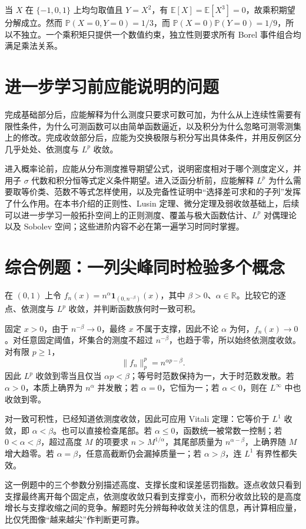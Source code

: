 \documentclass[UTF8,12pt,a4paper,fontset=fandol]{ctexbook}
\begin{document}
当 $X$ 在 $\{-1,0,1\}$ 上均匀取值且 $Y=X^2$，有 $\mathbb E[X]=\mathbb E[X^3]=0$，故乘积期望分解成立。然而
$\mathbb P(X=0,Y=0)=1/3$，而 $\mathbb P(X=0)\mathbb P(Y=0)=1/9$，所以不独立。一个乘积矩只提供一个数值约束，独立性则要求所有 Borel 事件组合均满足乘法关系。

\section{进一步学习前应能说明的问题}
完成基础部分后，应能解释为什么测度只要求可数可加，为什么从上连续性需要有限性条件，为什么可测函数可以由简单函数逼近，以及积分为什么忽略可测零测集上的修改。完成收敛部分后，应能为交换极限与积分写出具体条件，并用反例区分几乎处处、依测度与 $L^p$ 收敛。

进入概率论前，应能从分布测度推导期望公式，说明密度相对于哪个测度定义，并用子 $\sigma$ 代数和积分恒等式定义条件期望。进入泛函分析前，应能解释 $L^p$ 为什么需要取等价类、范数不等式怎样使用，以及完备性证明中“选择差可求和的子列”发挥了什么作用。在本书介绍的正则性、Lusin 定理、微分定理及弱收敛基础上，后续可以进一步学习一般拓扑空间上的正则测度、覆盖与极大函数估计、$L^p$ 对偶理论以及 Sobolev 空间；这些进阶内容不必在第一遍学习时同时掌握。

\section{综合例题：一列尖峰同时检验多个概念}
\begin{example}
在 $(0,1)$ 上令 $f_n(x)=n^\alpha\mathbf1_{(0,n^{-\beta})}(x)$，其中 $\beta>0$、$\alpha\in\mathbb R$。比较它的逐点、依测度与 $L^p$ 收敛，并判断函数族何时一致可积。
\end{example}
\begin{solve}
固定 $x>0$，由于 $n^{-\beta}\to0$，最终 $x$ 不属于支撑，因此不论 $\alpha$ 为何，$f_n(x)\to0$。对任意固定阈值，坏集合的测度不超过 $n^{-\beta}$，也趋于零，所以始终依测度收敛。对有限 $p\geq1$，
\[
 \|f_n\|_p^p=n^{\alpha p-\beta}.
\]
因此 $L^p$ 收敛到零当且仅当 $\alpha p<\beta$；等号时范数保持为一，大于时范数发散。若 $\alpha>0$，本质上确界为 $n^\alpha$ 并发散；若 $\alpha=0$，它恒为一；若 $\alpha<0$，则在 $L^\infty$ 中也收敛到零。

对一致可积性，已经知道依测度收敛，因此可应用 Vitali 定理：它等价于 $L^1$ 收敛，即 $\alpha<\beta$。也可以直接检查尾部。若 $\alpha\leq0$，函数统一被常数一控制；若 $0<\alpha<\beta$，超过高度 $M$ 的项要求 $n>M^{1/\alpha}$，其尾部质量为 $n^{\alpha-\beta}$，上确界随 $M$ 增大趋零。若 $\alpha=\beta$，任意高截断仍会漏掉质量一；若 $\alpha>\beta$，连 $L^1$ 有界性都失效。
\end{solve}
这一例题中的三个参数分别描述高度、支撑长度和误差惩罚指数。逐点收敛只看到支撑最终离开每个固定点，依测度收敛只看到支撑变小，而积分收敛比较的是高度增长与支撑收缩之间的竞争。解题时先分辨每种收敛关注的信息，再计算相应量，比仅凭图像“越来越尖”作判断更可靠。
\end{document}
